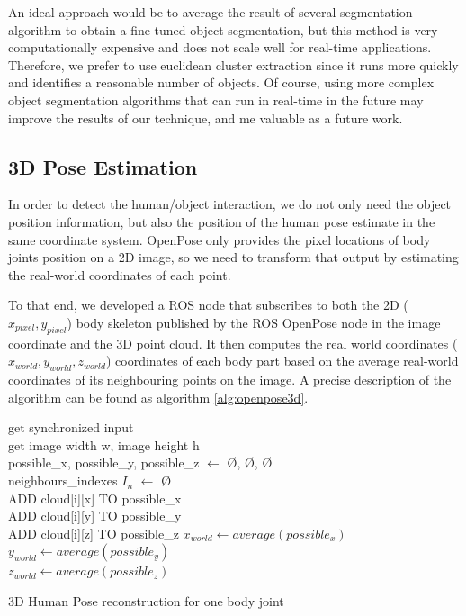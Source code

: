 An ideal approach would be to average the result of several segmentation algorithm to obtain a fine-tuned object segmentation, but this method is very computationally expensive and does not scale well for real-time applications. Therefore, we prefer to use euclidean cluster extraction since it runs more quickly and identifies a reasonable number of objects. Of course, using more complex object segmentation algorithms that can run in real-time in the future may improve the results of our technique, and me valuable as a future work.

\subsection{3D Pose Estimation}
In order to detect the human/object interaction, we do not only need the object position information, but also the position of the human pose estimate in the same coordinate system. OpenPose only provides the pixel locations of body joints position on a 2D image, so we need to transform that output by estimating the real-world coordinates of each point.

To that end, we developed a ROS node that subscribes to both the 2D ($x_{pixel}, y_{pixel}$) body skeleton published by the ROS OpenPose node in the image coordinate and the 3D point cloud. It then computes the real world coordinates ($x_{world}, y_{world}, z_{world}$) coordinates of each body part based on the average real-world coordinates of its neighbouring points on the image. A precise description of the algorithm can be found as algorithm \ref{alg:openpose3d}.

\begin{algorithm}[h]
    get synchronized input \\
    get image width w, image height h \\
    possible\_x, possible\_y, possible\_z $\leftarrow$ \O, \O, \O \\
    neighbours\_indexes $I_n$ $\leftarrow$ \O \\
    {
    {ADD cloud[i][x] TO possible\_x \\
    ADD cloud[i][y] TO possible\_y \\
    ADD cloud[i][z] TO possible\_z}
    $x_{world} \leftarrow average(possible_x)$ \\
    $y_{world} \leftarrow average(possible_y)$ \\
    $z_{world} \leftarrow average(possible_z)$}
    \caption{3D Human Pose reconstruction for one body joint}
    \label{alg:openpose3d}
\end{algorithm}


